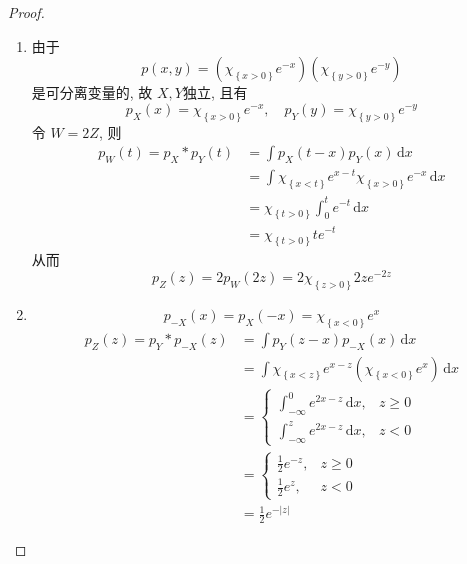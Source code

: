 \documentclass[../main.tex]{subfiles}
\begin{document}
\begin{proof}
    \begin{enumerate}
        \item 由于 \[
        p\left( x,y \right)= \left( \chi _{\left\{ x> 0 \right\}} e^{-x}\right) \left( \chi _{\left\{ y> 0 \right\}}e^{-y} \right)   
        \]是可分离变量的, 故 \(  X,Y  \)独立, 且有 \[
        p_{X}\left( x \right)= \chi _{\left\{ x> 0 \right\}}e^{-x},\quad p_{Y}\left( y \right)= \chi _{\left\{ y> 0 \right\}} e^{-y} 
        \]  令 \(  W= 2Z  \), 则 \[
       \begin{aligned}
        p_{W}\left( t\right)= p_{X}* p_{Y}\left( t \right)& = \int p_{X}\left( t-x\right)p_{Y}\left( x\right)\,\mathrm{d} x   \\ 
         &=  \int \chi _{\left\{ x< t \right\}}e^{x-t}\chi _{\left\{ x> 0 \right\}}e^{-x}\,\mathrm{d} x\\ 
          &= \chi _{\left\{ t> 0 \right\}} \int_{0}^{t}e^{-t}\,\mathrm{d} x\\ 
           &= \chi _{\left\{ t> 0 \right\}}te^{-t}
       \end{aligned}
        \]  从而 \[
        p_{Z}\left( z \right)= 2p_{W}\left( 2z \right) = 2\chi _{\left\{ z> 0 \right\}}2ze^{-2z} 
        \]
        \item   \[
        p_{-X}\left( x \right)= p_{X}\left( -x \right)= \chi _{\left\{ x< 0 \right\}}e^{x}  
        \]\[
        \begin{aligned}
        p_{Z}\left( z \right)= p_{Y}*p_{-X}\left( z \right)&= \int p_{Y}\left( z-x \right)p_{-X}\left( x \right)\,\mathrm{d} x    \\ 
         &= \int \chi _{\left\{ x< z \right\}}e^{x-z} \left(  \chi _{\left\{ x< 0 \right\}}e^{x} \right)\,\mathrm{d} x\\ 
          &=  \begin{cases} \int_{-\infty}^{0}e^{2x-z}\,\mathrm{d} x,&z\ge 0\\ 
           \int_{-\infty}^{z}e^{2x-z}\,\mathrm{d} x,& z< 0 \end{cases}\\ 
            &= \begin{cases} \frac{1}{2}e^{-z},&z\ge 0\\ 
             \frac{1}{2}e^{z},&z< 0 \end{cases}\\ 
              &= \frac{1}{2}e^{-\left| z \right| }  
        \end{aligned}
        \]
    \end{enumerate}
    
\end{proof}
\end{document}
